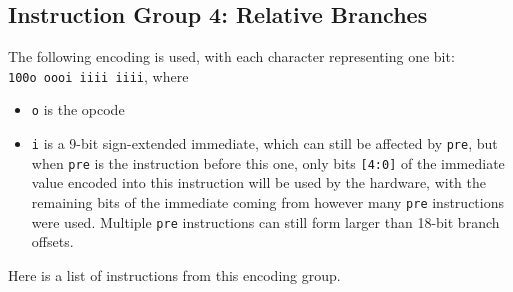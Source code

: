 \documentclass{article}
\begin{document}
	\doublespacing

	\subsection{Instruction Group 4:  Relative Branches}
	The following encoding is used, with each character representing one
	bit:  \\
	\texttt{100o oooi iiii iiii}, where

	\singlespacing
	\begin{itemize}
		\item \texttt{o} is the opcode
		\item \texttt{i} is a 9-bit sign-extended immediate, which can
		still be affected by \texttt{pre}, but when \texttt{pre} is the
		instruction before this one, only bits \texttt{[4:0]} of the
		immediate value encoded into this instruction will be used by the
		hardware, with the remaining bits of the immediate coming from
		however many \texttt{pre} instructions were used.  Multiple
		\texttt{pre} instructions can still form larger than 18-bit branch
		offsets.
	\end{itemize}
	\doublespacing

	Here is a list of instructions from this encoding group.
\end{document}
